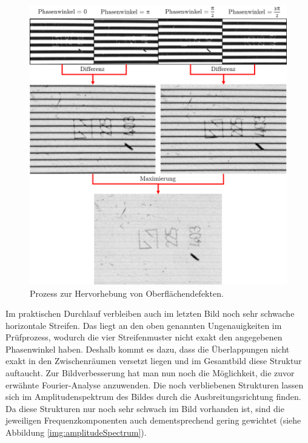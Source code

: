 \begin{figure}[H]
	\centering
	\includegraphics[width=\textwidth]{03_sichtpruefungDurchLichtstreuung/optimierungen/figures/imageTree}
	\caption[Prozess der Hervorhebung von Oberflächendefekten]{Prozess zur Hervorhebung von Oberflächendefekten.}
	\label{img:imageTree}
\end{figure}

\noindent
Im praktischen Durchlauf verbleiben auch im letzten Bild noch sehr schwache horizontale Streifen.
Das liegt an den oben genannten Ungenauigkeiten im Prüfprozess, wodurch die vier Streifenmuster nicht exakt den angegebenen Phasenwinkel haben.
Deshalb kommt es dazu, dass die Überlappungen nicht exakt in den Zwischenräumen versetzt liegen und im Gesamtbild diese Struktur auftaucht.
Zur Bildverbesserung hat man nun noch die Möglichkeit, die zuvor erwähnte Fourier-Analyse anzuwenden.
Die noch verbliebenen Strukturen lassen sich im Amplitudenspektrum des Bildes durch die Ausbreitungsrichtung finden.
Da diese Strukturen nur noch sehr schwach im Bild vorhanden ist, sind die jeweiligen Frequenzkomponenten auch dementsprechend gering gewichtet (siehe Abbildung \ref{img:amplitudeSpectrum}).

